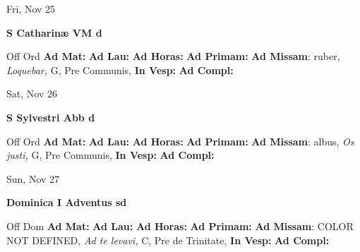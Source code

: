 \documentclass[10pt]{book}
\begin{document}
\begin{center}
\begin{minipage}{3.5in}
\vspace{2em}
\begin{center}Fri, Nov 25
\end{center}
\textbf{ \large S Catharinæ VM
\textnormal{\normalsize d}}

\begin{justify}Off Ord
\textbf{Ad Mat: }
\textbf{Ad Lau: }
\textbf{Ad Horas: }
\textbf{Ad Primam: }\textbf{Ad Missam}: ruber, \textit{Loquebar,} G, Pre Communis, 
\textbf{In Vesp: }
\textbf{Ad Compl: }
\end{justify}
\end{minipage}
\end{center}

\begin{center}
\begin{minipage}{3.5in}
\vspace{2em}
\begin{center}Sat, Nov 26
\end{center}
\textbf{ \large S Sylvestri Abb
\textnormal{\normalsize d}}

\begin{justify}Off Ord
\textbf{Ad Mat: }
\textbf{Ad Lau: }
\textbf{Ad Horas: }
\textbf{Ad Primam: }\textbf{Ad Missam}: albus, \textit{Os justi,} G, Pre Communis, 
\textbf{In Vesp: }
\textbf{Ad Compl: }
\end{justify}
\end{minipage}
\end{center}

\begin{center}
\begin{minipage}{3.5in}
\vspace{2em}
\begin{center}Sun, Nov 27
\end{center}
\textbf{ \large Dominica I Adventus
\textnormal{\normalsize sd}}

\begin{justify}Off Dom
\textbf{Ad Mat: }
\textbf{Ad Lau: }
\textbf{Ad Horas: }
\textbf{Ad Primam: }\textbf{Ad Missam}: COLOR NOT DEFINED, \textit{Ad te levavi,} C, Pre de Trinitate, 
\textbf{In Vesp: }
\textbf{Ad Compl: }
\end{justify}
\end{minipage}
\end{center}
\end{document}
